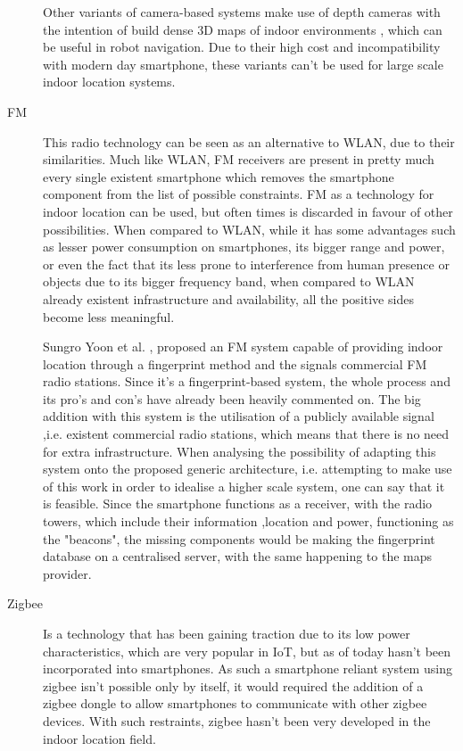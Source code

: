 \begin{description}
	Other variants of camera-based systems make use of depth cameras with the intention of build dense 3D maps of indoor environments \cite{camera_ex}, which can be useful in robot navigation. Due to their high cost and incompatibility with modern day smartphone, these variants can't be used for large scale indoor location systems.

\item[FM] This radio technology can be seen as an alternative to WLAN, due to their similarities. Much like WLAN, \ac{FM} receivers are present in pretty much every single existent smartphone which removes the smartphone component from the list of possible constraints. FM as a technology for indoor location can be used, but often times is discarded in favour of other possibilities. When compared to WLAN, while it has some advantages such as lesser power consumption on smartphones, its bigger range and power, or even the fact that its less prone to interference from human presence or objects due to its bigger frequency band, when compared to WLAN already existent infrastructure and availability, all the positive sides become less meaningful. 

	Sungro Yoon et al. \cite{fm_ex}, proposed an \ac{FM} system capable of providing indoor location through a fingerprint method and the signals commercial \ac{FM} radio stations. Since it's a fingerprint-based system, the whole process and its pro's and con's have already been heavily commented on. The big addition with this system is the utilisation of a publicly available signal ,i.e. existent commercial radio stations, which means that there is no need for extra infrastructure. 
	When analysing the possibility of adapting this system onto the proposed generic architecture, i.e. attempting to make use of this work in order to idealise a higher scale system, one can say that it is feasible. Since the smartphone functions as a receiver, with the radio towers, which include their information ,location and power, functioning as the "beacons", the missing components would be making the fingerprint database on a centralised server, with the same happening to the maps provider.

\item[Zigbee] Is a technology that has been gaining traction due to its low power characteristics, which are very popular in \ac{IoT}, but as of today hasn't been incorporated into smartphones. As such a smartphone reliant system using zigbee isn't possible only by itself, it would required the addition of a zigbee dongle to allow smartphones to communicate with other zigbee devices. With such restraints, zigbee hasn't been very developed in the indoor location field.
	

\end{description}
